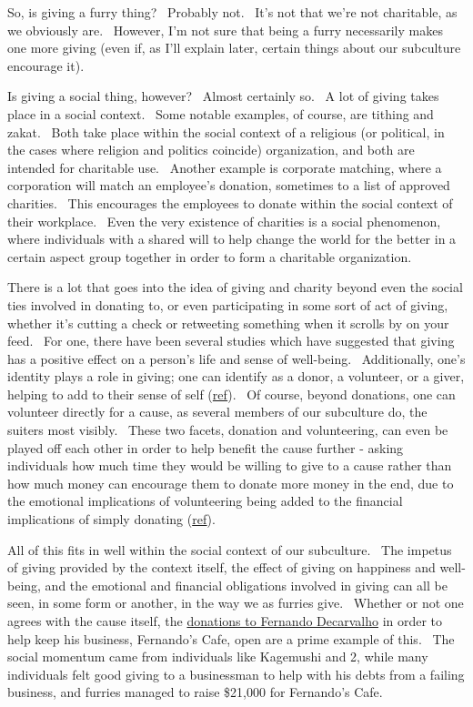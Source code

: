 So, is giving a furry thing? ~Probably not. ~It's not that we're not
charitable, as we obviously are. ~However, I'm not sure that being a
furry necessarily makes one more giving (even if, as I'll explain later,
certain things about our subculture encourage it).

Is giving a social thing, however? ~Almost certainly so. ~A lot of
giving takes place in a social context. ~Some notable examples, of
course, are tithing and zakat. ~Both take place within the social
context of a religious (or political, in the cases where religion and
politics coincide) organization, and both are intended for charitable
use. ~Another example is corporate matching, where a corporation will
match an employee's donation, sometimes to a list of approved charities.
~This encourages the employees to donate within the social context of
their workplace. ~Even the very existence of charities is a social
phenomenon, where individuals with a shared will to help change the
world for the better in a certain aspect group together in order to form
a charitable organization.

There is a lot that goes into the idea of giving and charity beyond even
the social ties involved in donating to, or even participating in some
sort of act of giving, whether it's cutting a check or retweeting
something when it scrolls by on your feed. ~For one, there have been
several studies which have suggested that giving has a positive effect
on a person's life and sense of well-being. ~Additionally, one's
identity plays a role in giving; one can identify as a donor, a
volunteer, or a giver, helping to add to their sense of self
(\href{http://faculty-gsb.stanford.edu/aaker/pages/documents/Whydopeoplegive_Theroleofidentityingiving.pdf}{ref}).
~Of course, beyond donations, one can volunteer directly for a cause, as
several members of our subculture do, the suiters most visibly. ~These
two facets, donation and volunteering, can even be played off each other
in order to help benefit the cause further - asking individuals how much
time they would be willing to give to a cause rather than how much money
can encourage them to donate more money in the end, due to the emotional
implications of volunteering being added to the financial implications
of simply donating
(\href{http://faculty-gsb.stanford.edu/aaker/pages/documents/Happinessofgiving.pdf}{ref}).

All of this fits in well within the social context of our subculture.
~The impetus of giving provided by the context itself, the effect of
giving on happiness and well-being, and the emotional and financial
obligations involved in giving can all be seen, in some form or another,
in the way we as furries give. ~Whether or not one agrees with the cause
itself, the
\href{http://www.flayrah.com/3993/furry-fans-give-generously-fernando-over-20000-raised}{donations
to Fernando Decarvalho} in order to help keep his business, Fernando's
Cafe, open are a prime example of this. ~The social momentum came from
individuals like Kagemushi and 2, while many individuals felt good
giving to a businessman to help with his debts from a failing business,
and furries managed to raise \$21,000 for Fernando's Cafe.


